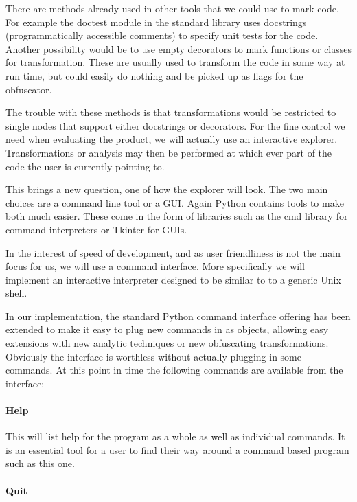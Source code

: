 \documentclass{report}
\begin{document}
There are methods already used in other tools that we could use to mark code. For example the doctest module in the standard
library uses docstrings (programmatically accessible comments) to specify unit tests for the code. Another possibility would
be to use empty decorators to mark functions or classes for transformation. These are usually used to transform the code in
some way at run time, but could easily do nothing and be picked up as flags for the obfuscator.

The trouble with these methods is that transformations would be restricted to single nodes that support either docstrings or
decorators. For the fine control we need when evaluating the product, we will actually use an interactive explorer.
Transformations or analysis may then be performed at which ever part of the code the user is currently pointing to.

This brings a new question, one of how the explorer will look. The two main choices are a command line tool or a GUI. Again
Python contains tools to make both much easier. These come in the form of libraries such as the cmd library \cite{pycmd} for command
interpreters or Tkinter \cite{pytkinter} for GUIs.

In the interest of speed of development, and as user friendliness is not the main focus for us, we will use a command interface.
More specifically we will implement an interactive interpreter designed to be similar to to a generic Unix shell.

In our implementation, the standard Python command interface offering has been extended to make it easy to plug new commands in as
objects, allowing easy extensions with new analytic techniques or new obfuscating transformations. Obviously the
interface is worthless without actually plugging in some commands. At this point in time the following commands are available from the
interface:

\paragraph{Help}

This will list help for the program as a whole as well as individual commands. It is an essential tool for a user to find their way around a
command based program such as this one.

\paragraph{Quit}
\end{document}
